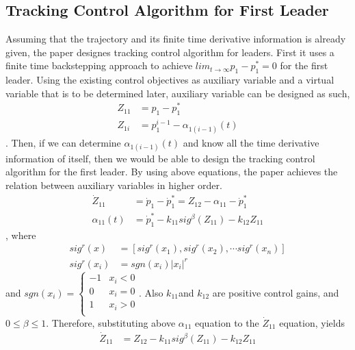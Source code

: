 \subsection*{Tracking Control Algorithm for First Leader} \label{Tracking_Control_Algorithm_First_Leader}
 Assuming that the trajectory and its finite time derivative information is already given, the paper designes tracking control algorithm for leaders. First it uses a finite time backstepping approach to achieve $lim_{t\rightarrow \infty} p_1 - p_1^* = 0$ for the first leader. Using the existing control objectives as auxiliary variable and a virtual variable that is to be determined later, auxiliary variable can be designed as such,
 \begin{align*}
    Z_{11} &= p_1 - p_1^*\\
    Z_{1i} &= p_1^{i-1} - \alpha_{1(i-1)} (t)
 \end{align*}.
 Then, if we can determine $\alpha_{1(i-1)} (t)$ and know all the time derivative information of itself, then we would be able to design the tracking control algorithm for the first leader. By using above equations, the paper achieves the relation between auxiliary variables in higher order. 
 \begin{align*}
    \dot Z_{11} &= \dot p_1 - \dot p_1^* = Z_{12} - \alpha_{11} - \dot p_1^*\\
    \alpha_{11} (t) &= \dot p_1^{*} - k_{11} sig ^{\beta}(Z_{11}) - k_12 Z_{11}
 \end{align*}, where
 \begin{align*}
    sig^r(x)   &= [sig^r(x_1), sig^r(x_2), \cdots sig^r(x_n)]\\
    sig^r(x_i) &= sgn(x_i) |x_i|^r
 \end{align*} and $sgn(x_i) = 
 \begin{cases} 
    -1 & x_i < 0\\
    0 & x_i = 0\\
    1 & x_i > 0\\
\end{cases}$. Also $k_{11}$and $ k_{12}$ are positive control gains, and $0 \leq \beta \leq 1$. 
Therefore, substituting above $\alpha_{11}$ equation to the $\dot Z_{11}$ equation, yields
\begin{align*}
    \dot Z_{11} &= Z_{12} - k_{11} sig ^{\beta}(Z_{11}) - k_{12} Z_{11}
\end{align*}
